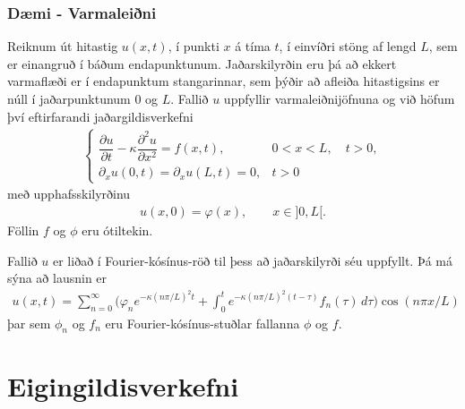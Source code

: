 \documentclass[a4paper,10pt,icelandic]{sphinxmanual}
\begin{document}
\subsection{Dæmi - Varmaleiðni}
\label{\detokenize{Kafli02:daemi-varmaleini}}
Reiknum út hitastig \(u(x,t)\), í punkti \(x\) á tíma \(t\),  í einvíðri stöng af lengd \(L\), sem er einangruð í báðum endapunktunum. Jaðarskilyrðin eru þá að ekkert varmaflæði er í endapunktum stangarinnar,  sem þýðir að afleiða hitastigsins er núll í jaðarpunktunum 0 og \(L\). Fallið \(u\) uppfyllir varmaleiðnijöfnuna og við höfum því eftirfarandi jaðargildisverkefni
\begin{equation*}
\begin{split}\begin{cases} \dfrac{{\partial} u}{{\partial}t}-{\kappa}
 \dfrac{{\partial}^2 u}{{\partial}x^2}=f(x,t), &0<x<L, \quad t>0,\\
 {\partial}_xu(0,t)={\partial}_xu(L,t)=0, &t>0
 \end{cases}\end{split}
\end{equation*}
með upphafsskilyrðinu
\begin{equation*}
\begin{split}u(x,0)=\varphi(x), \qquad x\in ]0,L[.\end{split}
\end{equation*}
Föllin \(f\) og \(\phi\) eru ótiltekin.

Fallið \(u\) er liðað í Fourier-kósínus-röð til þess að jaðarskilyrði séu uppfyllt. Þá má sýna að lausnin er
\begin{equation*}
\begin{split}u(x,t)=\sum_{n=0}^{\infty}
 \bigg(\varphi_ne^{-{\kappa}(n{\pi}/L)^2t}+
 \int_0^te^{-{\kappa}(n{\pi}/L)^2(t-{\tau})}f_n({\tau})\, d{\tau}\bigg)
 \cos(n{\pi}x/L)\end{split}
\end{equation*}
þar sem \(\phi_n\) og \(f_n\) eru Fourier-kósínus-stuðlar fallanna \(\phi\) og \(f\).


\chapter{Eigingildisverkefni}
\label{\detokenize{Kafli03:eigingildisverkefni}}\label{\detokenize{Kafli03::doc}}
\end{document}

